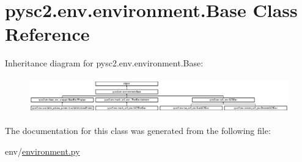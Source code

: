 \hypertarget{classpysc2_1_1env_1_1environment_1_1_base}{}\section{pysc2.\+env.\+environment.\+Base Class Reference}
\label{classpysc2_1_1env_1_1environment_1_1_base}
Inheritance diagram for pysc2.\+env.\+environment.\+Base\+:\begin{figure}[H]
\begin{center}
\leavevmode
\includegraphics[height=1.546961cm]{classpysc2_1_1env_1_1environment_1_1_base}
\end{center}
\end{figure}


The documentation for this class was generated from the following file\+:\begin{DoxyCompactItemize}
\item 
env/\mbox{\hyperlink{environment_8py}{environment.\+py}}\end{DoxyCompactItemize}
